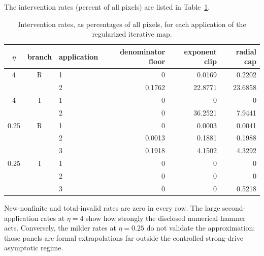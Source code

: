 \documentclass[11pt]{article}
\theoremstyle{remark}
\begin{document}
The intervention rates (percent of all pixels) are listed in
Table~\ref{tab:intervention-rates}.
\begin{table}[htbp]
\centering
\caption{Intervention rates, as percentages of all pixels, for each
application of the regularized iterative map.}
\label{tab:intervention-rates}
\small
\begin{tabular}{cclrrr}
\hline
\(\eta\)&branch&application&denominator floor&exponent clip&radial cap\\ \hline
4&R&1&0&0.0169&0.2202\\
 &&2&0.1762&22.8771&23.6858\\
4&I&1&0&0&0\\
 &&2&0&36.2521&7.9441\\
0.25&R&1&0&0.0003&0.0041\\
 &&2&0.0013&0.1881&0.1988\\
 &&3&0.1918&4.1502&4.3292\\
0.25&I&1&0&0&0\\
 &&2&0&0&0\\
 &&3&0&0&0.5218\\ \hline
\end{tabular}
\end{table}
New-nonfinite and total-invalid rates are zero in every row.  The large
second-application rates at \(\eta=4\) show how strongly the disclosed
numerical hammer acts.  Conversely, the milder rates at \(\eta=0.25\) do not
validate the approximation: those panels are formal extrapolations far
outside the controlled strong-drive asymptotic regime.
\end{document}
